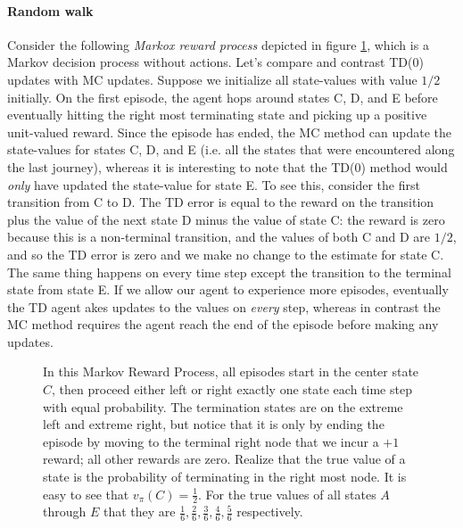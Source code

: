 \documentclass[12pt]{article}
\begin{document}
\paragraph{Random walk}
Consider the following \emph{Markox reward process} depicted in figure \ref{fig: mrprandomwalk}, which is a Markov decision process without actions. Let's compare and contrast TD(0) updates with MC updates. Suppose we initialize all state-values with value $1/2$ initially. On the first episode, the agent hops around states C, D, and E before eventually hitting the right most terminating state and picking up a positive unit-valued reward. Since the episode has ended, the MC method can update the state-values for states C, D, and E (i.e. all the states that were encountered along the last journey), whereas it is interesting to note that the TD(0) method would \emph{only} have updated the state-value for state E. To see this, consider the first transition from C to D. The TD error is equal to the reward on the transition plus the value of the next state D minus the value of state C: the reward is zero because this is a non-terminal transition, and the values of both C and D are $1/2$, and so the TD error is zero and we make no change to the estimate for state C. The same thing happens on every time step except the transition to the terminal state from state E. If we allow our agent to experience more episodes, eventually the TD agent akes updates to the values on \emph{every} step, whereas in contrast the MC method requires the agent reach the end of the episode before making any updates.

\begin{figure}[h]
  \centering
  \caption{\footnotesize In this Markov Reward Process, all episodes start in the center state $C$, then proceed either left or right exactly one state each time step with equal probability. The termination states are on the extreme left and extreme right, but notice that it is only by ending the episode by moving to the terminal right node that we incur a $+1$ reward; all other rewards are zero. Realize that the true value of a state is the probability of terminating in the right most node. It is easy to see that $v_\pi(C) = \frac{1}{2}$. For the true values of all states $A$ through $E$ that they are $\frac{1}{6}, \frac{2}{6}, \frac{3}{6}, \frac{4}{6}, \frac{5}{6}$ respectively.}
\label{fig: mrprandomwalk}
\end{figure}
\end{document}
